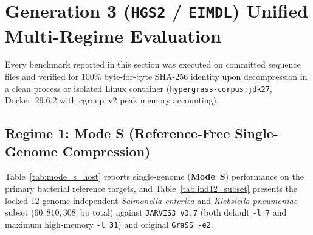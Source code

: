 \documentclass[10pt]{article}
\theoremstyle{definition}
\begin{document}
\section{Generation 3 (\texttt{HGS2} / \texttt{EIMDL}) Unified Multi-Regime Evaluation}

Every benchmark reported in this section was executed on committed sequence files and verified for $100\%$ byte-for-byte SHA-256 identity upon decompression in a clean process or isolated Linux container (\texttt{hypergrass-corpus:jdk27}, Docker~29.6.2 with cgroup~v2 peak memory accounting).

\subsection{Regime 1: Mode S (Reference-Free Single-Genome Compression)}

Table~\ref{tab:mode_s_host} reports single-genome (\textbf{Mode~S}) performance on the primary bacterial reference targets, and Table~\ref{tab:ind12_subset} presents the locked 12-genome independent \textit{Salmonella enterica} and \textit{Klebsiella pneumoniae} subset ($60,810,308$~bp total) against \texttt{JARVIS3 v3.7} (both default \texttt{-l 7} and maximum high-memory \texttt{-l 31}) and original \texttt{GraSS -e2}.

\begin{table}[h!]
\centering
\caption{Mode~S reference-free single-genome compression on host bacterial targets (\texttt{mode\_s\_and\_synthetic.json}). Note: \texttt{JARVIS3} was not run on these four host files; see Table~\ref{tab:ind12_subset} for the locked 12-genome \texttt{JARVIS3 -l 7} and \texttt{-l 31} evaluation.}
\label{tab:mode_s_host}
\end{table}
\end{document}
